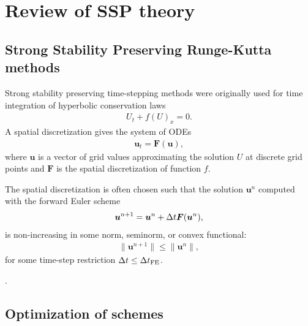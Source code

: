 \section{Review of SSP theory}\label{sec:SSP}

\subsection{Strong Stability Preserving Runge-Kutta methods}\label{subsec:SSPRK}


\quad Strong stability preserving time-stepping methods were originally used for time integration of hyperbolic conservation laws
\begin{align*}
    U_t + f(U)_x = 0.   %
\end{align*}
A spatial discretization gives the system of ODEs
\begin{align*}
    \bm{u}_{t} = \bm{F}(\bm{u}),
\end{align*}
where $\bm{u}$ is a vector of grid values approximating the solution $U$ at discrete grid points and $\bm{F}$ is the spatial discretization of function $f$.

The spatial discretization is often chosen such that the solution $\bm{u}^{n}$ computed with the forward Euler scheme
\begin{align*}
    \bm{u}^{n+1} = \bm{u}^{n} + \Delta t\bm{F}(\bm{u}^{n}),
\end{align*}
is non-increasing in some norm, seminorm, or convex functional:
\begin{align*}
    \|\bm{u}^{n+1}\| \le \|\bm{u}^n\|,
\end{align*}
for some time-step restriction $\Delta t \leq \Delta t_{\text{FE}}$.


.

\subsection{Optimization of schemes}\label{subsec:Optimal_SSPRK}

